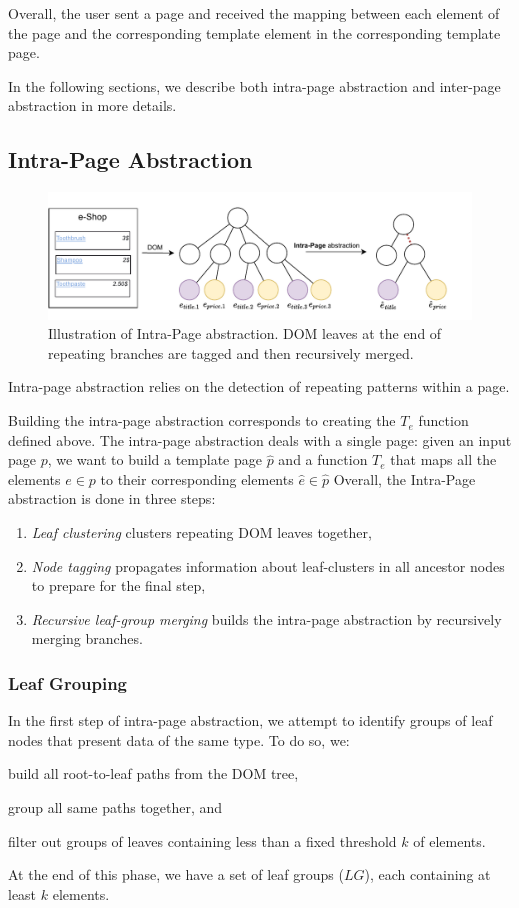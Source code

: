\documentclass[sigconf,authordraft]{acmart}
\theoremstyle{definition}
\begin{document}
Overall, the user sent a page and received the mapping between each element of the page and the corresponding template element in the corresponding template page.

In the following sections, we describe both intra-page abstraction and inter-page abstraction in more details.

\subsection{Intra-Page Abstraction}

\begin{figure}[ht]
  \centering
  \includegraphics[width=0.8\linewidth]{explanations/intra}
  \caption{Illustration of Intra-Page abstraction. DOM leaves at the end of repeating branches are tagged and then recursively merged.}
  \label{fig:intra}
\end{figure}

Intra-page abstraction relies on the detection of repeating patterns within a page. 

Building the intra-page abstraction corresponds to creating the $T_e$ function defined above.
The intra-page abstraction deals with a single page: given an input page $p$, we want to build a template page $\hat{p}$ and a function $T_e$ that maps all the elements $e \in p$  to their corresponding elements $\hat{e} \in \hat{p}$
Overall, the Intra-Page abstraction is done in three steps:
\begin{enumerate}
  \item \emph{Leaf clustering} clusters repeating DOM leaves together,
  \item \emph{Node tagging} propagates information about leaf-clusters in all ancestor nodes to prepare for the final step,
  \item \emph{Recursive leaf-group merging} builds the intra-page abstraction by recursively merging branches.
\end{enumerate}

\subsubsection{Leaf Grouping}
In the first step of intra-page abstraction, we attempt to identify groups of leaf nodes that present data of the same type.
To do so, we:
\begin{inparaenum}
  \item build all root-to-leaf paths from the DOM tree,
  \item group all same paths together, and
  \item filter out groups of leaves containing less than a fixed threshold $k$ of elements.
\end{inparaenum}
At the end of this phase, we have a set of leaf groups ($LG$), each containing at least $k$ elements.
\end{document}
